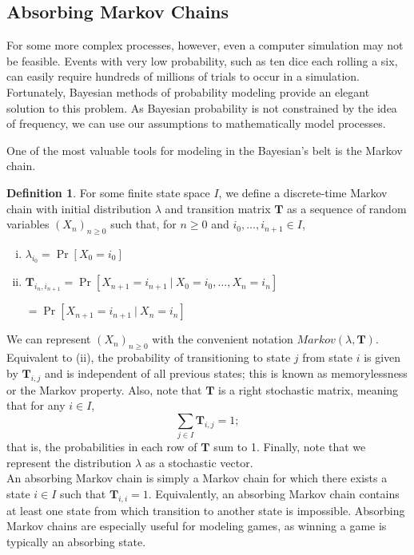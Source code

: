 \documentclass{article}
\newcommand{\T}{\textbf{{T}}}
\theoremstyle{definition}
\newtheorem{defn}{Definition}
\theoremstyle{plain}
\begin{document}
	\subsection{Absorbing Markov Chains}
	For some more complex processes, however, even a computer simulation may not be feasible. Events with very low probability, such as ten dice each rolling a six, can easily require hundreds of millions of trials to occur in a simulation. Fortunately, Bayesian methods of probability modeling provide an elegant solution to this problem. As Bayesian probability is not constrained by the idea of frequency, we can use our assumptions to mathematically model processes.


	One of the most valuable tools for modeling in the Bayesian's belt is the Markov chain. 

\begin{defn}
For some finite state space $I$, we define a discrete-time Markov chain with initial distribution $\lambda$ and transition matrix $\T$ as a  sequence of random variables $(X_n)_{n \geq 0}$ such that, for $n \geq 0$ and $i_0, \dots, i_{n+1} \in I$,
	\begin{enumerate}[(i)]
	\item $\lambda_{i_0} = \Pr[X_0 = i_0]$  
	\item $\T_{i_n, i_{n+1}} = \Pr[X_{n+1} = i_{n+1} ~|~ {X_0 = i_0}, \dots, X_{n}=i_n]$

	\hspace{3.7em}$ = \Pr[X_{n+1} = i_{n+1} ~|~ X_{n} = i_n]$
	\end{enumerate}
\end{defn}
We can represent $(X_n)_{n \geq 0}$ with the convenient notation $Markov(\lambda, \T)$. Equivalent to (ii), the probability of transitioning to state $j$ from state $i$ is given by $\T_{i, j}$ and is independent of all previous states; this is known as memorylessness or the Markov property. Also, note that $\T$ is a right stochastic matrix, meaning that for any $i \in I$, \[\sum_{j\in I} \T_{i, j} = 1;\] that is, the probabilities in each row of $\T$ sum to 1. Finally, note that we represent the distribution $\lambda$ as a stochastic vector.
\\
	
	An absorbing Markov chain is simply a Markov chain for which there exists a state $i \in I$ such that $\T_{i,i} = 1$. Equivalently, an absorbing Markov chain contains at least one state from which transition to another state is impossible. Absorbing Markov chains are especially useful for modeling games, as winning a game is typically an absorbing state.
	
\end{document}
